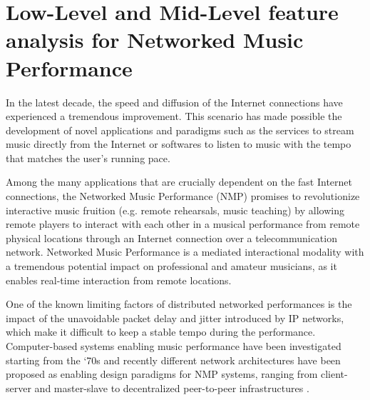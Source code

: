 \chapter{Low-Level and Mid-Level feature analysis for Networked Music Performance}
\label{Chap:NMP}


In the latest decade, the speed and diffusion of the Internet connections have experienced a tremendous improvement. This scenario has made possible the development of novel applications and paradigms such as the services to stream music directly from the Internet or softwares to listen to music with the tempo that matches the user's running pace.

Among the many applications that are crucially dependent on the fast Internet connections, the Networked Music Performance (NMP) promises to revolutionize interactive music fruition (e.g. remote rehearsals, music teaching) by allowing remote players to interact with each other in a musical performance from remote physical locations through an Internet connection over a telecommunication network. Networked Music Performance is a mediated interactional modality with a tremendous potential impact on professional and amateur musicians, as it enables real-time interaction from remote locations.

One  of the known limiting factors of distributed networked performances is the impact of the unavoidable packet delay and jitter introduced by IP networks, which make it difficult to keep a stable tempo during the performance. Computer-based systems enabling music performance have been investigated starting from the \lq 70s \cite{barbosa2003displaced} and recently different network architectures have been proposed as enabling design paradigms for NMP systems, ranging from client-server \cite{saputra2012design,gu2005network} and master-slave \cite{renwick2012sourcenode} to decentralized peer-to-peer infrastructures \cite{stais2013networked,chafe2011living}. 


